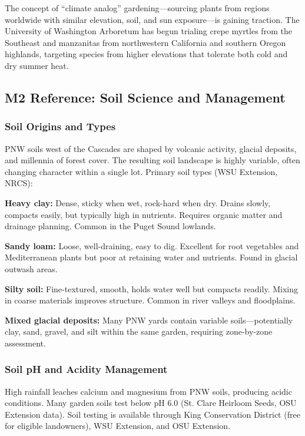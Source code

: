 \documentclass[11pt,letterpaper]{article}
\begin{document}
The concept of ``climate analog'' gardening---sourcing plants from regions worldwide with similar elevation, soil, and sun exposure---is gaining traction. The University of Washington Arboretum has begun trialing crepe myrtles from the Southeast and manzanitas from northwestern California and southern Oregon highlands, targeting species from higher elevations that tolerate both cold and dry summer heat.

\subsection{M2 Reference: Soil Science and Management}

\subsubsection{Soil Origins and Types}

PNW soils west of the Cascades are shaped by volcanic activity, glacial deposits, and millennia of forest cover. The resulting soil landscape is highly variable, often changing character within a single lot. Primary soil types (WSU Extension, NRCS):

\textbf{Heavy clay:} Dense, sticky when wet, rock-hard when dry. Drains slowly, compacts easily, but typically high in nutrients. Requires organic matter and drainage planning. Common in the Puget Sound lowlands.

\textbf{Sandy loam:} Loose, well-draining, easy to dig. Excellent for root vegetables and Mediterranean plants but poor at retaining water and nutrients. Found in glacial outwash areas.

\textbf{Silty soil:} Fine-textured, smooth, holds water well but compacts readily. Mixing in coarse materials improves structure. Common in river valleys and floodplains.

\textbf{Mixed glacial deposits:} Many PNW yards contain variable soils---potentially clay, sand, gravel, and silt within the same garden, requiring zone-by-zone assessment.

\subsubsection{Soil pH and Acidity Management}

High rainfall leaches calcium and magnesium from PNW soils, producing acidic conditions. Many garden soils test below pH 6.0 (St. Clare Heirloom Seeds, OSU Extension data). Soil testing is available through King Conservation District (free for eligible landowners), WSU Extension, and OSU Extension.
\end{document}
